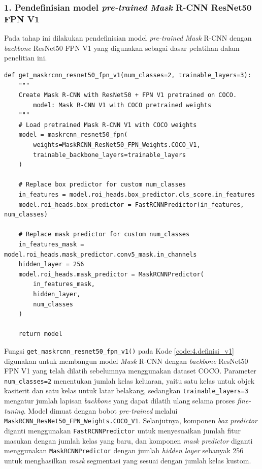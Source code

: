\subsubsection*{\textnormal{1. Pendefinisian model \textit{pre-trained} \textit{Mask} R-CNN ResNet50 FPN V1}}
Pada tahap ini dilakukan pendefinisian model \textit{pre-trained} \textit{Mask} R-CNN dengan \textit{backbone} ResNet50 FPN V1 yang digunakan sebagai dasar pelatihan dalam penelitian ini.

\begin{lstlisting}[caption={Pendefinisian Model \textit{pre-trained} \textit{Mask} R-CNN ResNet50 FPN V1}, label={code:4.definisi_v1}]
def get_maskrcnn_resnet50_fpn_v1(num_classes=2, trainable_layers=3):
    """
    Create Mask R-CNN with ResNet50 + FPN V1 pretrained on COCO.
        model: Mask R-CNN V1 with COCO pretrained weights
    """
    # Load pretrained Mask R-CNN V1 with COCO weights
    model = maskrcnn_resnet50_fpn(
        weights=MaskRCNN_ResNet50_FPN_Weights.COCO_V1,
        trainable_backbone_layers=trainable_layers
    )
    
    # Replace box predictor for custom num_classes
    in_features = model.roi_heads.box_predictor.cls_score.in_features
    model.roi_heads.box_predictor = FastRCNNPredictor(in_features, num_classes)
    
    # Replace mask predictor for custom num_classes
    in_features_mask = model.roi_heads.mask_predictor.conv5_mask.in_channels
    hidden_layer = 256
    model.roi_heads.mask_predictor = MaskRCNNPredictor(
        in_features_mask,
        hidden_layer,
        num_classes
    )
    
    return model
\end{lstlisting}

Fungsi \texttt{get\_maskrcnn\_resnet50\_fpn\_v1()} pada Kode \ref{code:4.definisi_v1} digunakan untuk membangun model \textit{Mask} R-CNN dengan \textit{backbone} ResNet50 FPN V1 yang telah dilatih sebelumnya menggunakan dataset COCO. Parameter \texttt{num\_classes=2} menentukan jumlah kelas keluaran, yaitu satu kelas untuk objek kasiterit dan satu kelas untuk latar belakang, sedangkan \texttt{trainable\_layers=3} mengatur jumlah lapisan \textit{backbone} yang dapat dilatih ulang selama proses \textit{fine-tuning}. Model dimuat dengan bobot \textit{pre-trained} melalui \texttt{MaskRCNN\_ResNet50\_FPN\_Weights.COCO\_V1}. Selanjutnya, komponen \textit{box predictor} diganti menggunakan \texttt{FastRCNNPredictor} untuk menyesuaikan jumlah fitur masukan dengan jumlah kelas yang baru, dan komponen \textit{mask predictor} diganti menggunakan \texttt{MaskRCNNPredictor} dengan jumlah \textit{hidden layer} sebanyak 256 untuk menghasilkan \textit{mask} segmentasi yang sesuai dengan jumlah kelas kustom. \par

